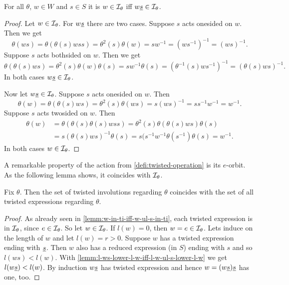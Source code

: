 \begin{lemm}
	For all $\theta$, $w \in W$ and $s \in S$ it is $w \in \mathcal{I}_{\theta}$ iff $w \underline{s} \in \mathcal{I}_{\theta}$.

	\begin{proof}
		Let $w \in \mathcal{I}_{\theta}$. For $w \underline{s}$ there are two cases. Suppose $s$ acts onesided on $w$. Then we get
		$$ \theta(ws) = \theta(\theta(s)wss) = \theta^2(s) \theta(w) = sw^{-1} = (ws^{-1})^{-1} = (ws)^{-1}. $$
		Suppose $s$ acts bothsided on $w$. Then we get
		$$ \theta(\theta(s)ws) = \theta^2(s) \theta(w) \theta(s) = sw^{-1}\theta(s) = (\theta^{-1}(s)ws^{-1})^{-1} = (\theta(s)ws)^{-1}. $$
		In both cases $w \underline{s} \in \mathcal{I}_{\theta}$.

		Now let $w \underline{s} \in \mathcal{I}_{\theta}$. Suppose $s$ acts onesided on $w$. Then
		$$ \theta(w) = \theta(\theta(s)ws) = \theta^2(s)\theta(ws) = s (ws)^{-1} = ss^{-1}w^{-1} = w^{-1}. $$
		Suppose $s$ acts twosided on $w$. Then
		\begin{align*}
			\theta(w)	& = \theta(\theta(s)\theta(s)wss) = \theta^2(s) \theta(\theta(s)ws) \theta(s) \\
						& = s (\theta(s)ws)^{-1} \theta(s) = s(s^{-1} w^{-1} \theta(s^{-1}) \theta(s) = w^{-1}.
		\end{align*}
		In both cases $w \in \mathcal{I}_{\theta}$.
	\end{proof}
\end{lemm}

A remarkable property of the action from \ref{defi:twisted-operation} is its $e$-orbit. As the following lemma shows, it coincides with $\mathcal{I}_{\theta}$.

\begin{lemm}
	Fix $\theta$. Then the set of twisted involutions regarding $\theta$ coincides with the set of all twisted expressions regarding $\theta$.

	\begin{proof}
		As already seen in \ref{lemm:w-in-ti-iff-w-ul-s-in-ti}, each twisted expression is in $\mathcal{I}_{\theta}$, since $e \in \mathcal{I}_{\theta}$. So let $w \in \mathcal{I}_{\theta}$. If $l(w) = 0$, then $w = e \in \mathcal{I}_{\theta}$. Lets induce on the length of $w$ and let $l(w) = r > 0$. Suppose $w$ has a twisted expression ending with $\underline{s}$. Then $w$ also has a reduced expression (in $S$) ending with $s$ and so $l(ws) < l(w)$. With \ref{lemm:l-ws-lower-l-w-iff-l-w-ul-s-lower-l-w} we get $l(w \underline{s}) < l(w)$. By induction $w \underline{s}$ has twisted expression and hence $w = (w \underline{s}) \underline{s}$ has one, too.
	\end{proof} 
\end{lemm}

